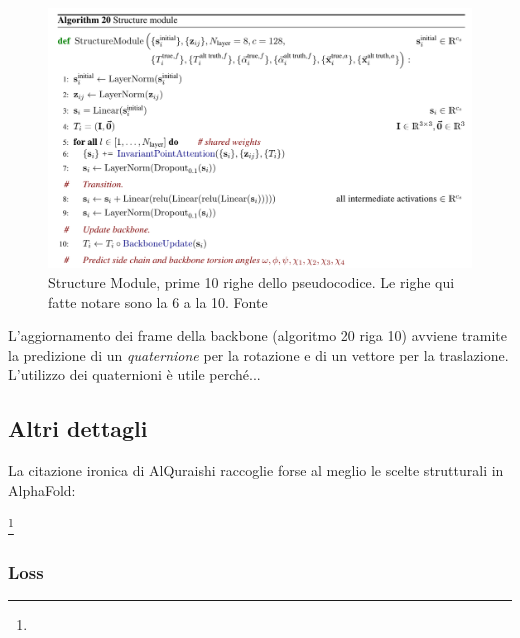 \begin{figure}[!htb]
	\centering
	\includegraphics[scale=0.5]{images/alg20.png}
	\caption{Structure Module, prime 10 righe dello pseudocodice. Le righe qui fatte notare sono la 6 a la 10. Fonte\cite{supplementaryjumper2021highly}}
	\label{fig:alg-20}
\end{figure}

L'aggiornamento dei frame della backbone (algoritmo 20 riga 10) avviene tramite la predizione di un \textit{quaternione} per la rotazione e di un vettore per la traslazione. L'utilizzo dei quaternioni è utile perché...

\subsection{Altri dettagli}

La citazione ironica di AlQuraishi raccoglie forse al meglio le scelte strutturali in AlphaFold:

\footnote{}\\

\subsubsection{Loss}


